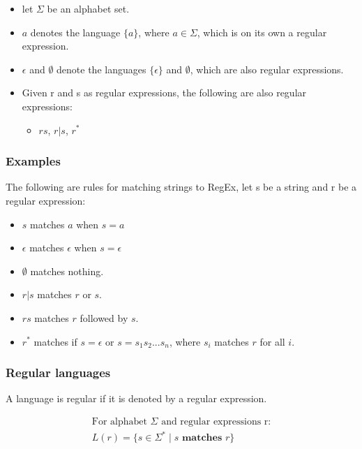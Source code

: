 \documentclass{article}
\begin{document}
\begin{itemize}
    \item let $\Sigma$ be an alphabet set.
    \item $a$ denotes the language $\{a\}$, where $a \in \Sigma$, which is on its own a regular expression.
    \item $\epsilon$ and $\emptyset$ denote the languages $\{\epsilon\}$ and $\emptyset$, which are also regular expressions.
    \item Given r and s as regular expressions, the following are also regular expressions:
          \begin{itemize}
              \item $rs$, $r|s$, $r^*$
          \end{itemize}
\end{itemize}

\subsubsection{Examples}

The following are rules for matching strings to RegEx, let s be a string and r be a regular expression:

\begin{itemize}
    \item $s$ matches $a$ when $s = a$
    \item $\epsilon$ matches $\epsilon$ when $s = \epsilon$
    \item $\emptyset$ matches nothing.
    \item $r|s$ matches $r$ or $s$.
    \item $rs$ matches $r$ followed by $s$.
    \item $r^*$ matches if $s = \epsilon$ or $s = s_1s_2...s_n$, where $s_i$ matches $r$ for all $i$.
\end{itemize}

\subsubsection{Regular languages}

A language is regular if it is denoted by a regular expression.

\begin{align*}
    \text{For alphabet $\Sigma$ and regular expressions r:} \\
    L(r) = \{s \in \Sigma^* \mid s \textbf{ matches } r\}
\end{align*}
\end{document}
